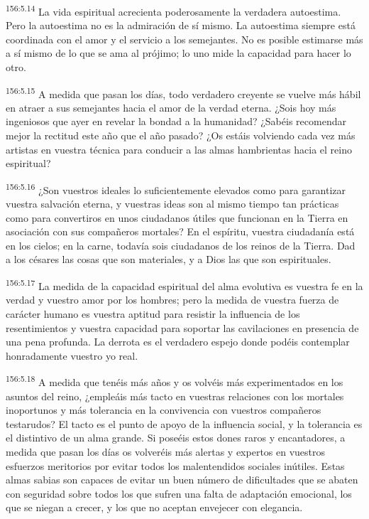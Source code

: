 \par 
\textsuperscript{156:5.14} La vida espiritual acrecienta poderosamente la verdadera autoestima. Pero la autoestima no es la admiración de sí mismo. La autoestima siempre está coordinada con el amor y el servicio a los semejantes. No es posible estimarse más a sí mismo de lo que se ama al prójimo; lo uno mide la capacidad para hacer lo otro.

\par 
\textsuperscript{156:5.15} A medida que pasan los días, todo verdadero creyente se vuelve más hábil en atraer a sus semejantes hacia el amor de la verdad eterna. ¿Sois hoy más ingeniosos que ayer en revelar la bondad a la humanidad? ¿Sabéis recomendar mejor la rectitud este año que el año pasado? ¿Os estáis volviendo cada vez más artistas en vuestra técnica para conducir a las almas hambrientas hacia el reino espiritual?

\par 
\textsuperscript{156:5.16} ¿Son vuestros ideales lo suficientemente elevados como para garantizar vuestra salvación eterna, y vuestras ideas son al mismo tiempo tan prácticas como para convertiros en unos ciudadanos útiles que funcionan en la Tierra en asociación con sus compañeros mortales? En el espíritu, vuestra ciudadanía está en los cielos; en la carne, todavía sois ciudadanos de los reinos de la Tierra. Dad a los césares las cosas que son materiales, y a Dios las que son espirituales.

\par 
\textsuperscript{156:5.17} La medida de la capacidad espiritual del alma evolutiva es vuestra fe en la verdad y vuestro amor por los hombres; pero la medida de vuestra fuerza de carácter humano es vuestra aptitud para resistir la influencia de los resentimientos y vuestra capacidad para soportar las cavilaciones en presencia de una pena profunda. La derrota es el verdadero espejo donde podéis contemplar honradamente vuestro yo real.

\par 
\textsuperscript{156:5.18} A medida que tenéis más años y os volvéis más experimentados en los asuntos del reino, ¿empleáis más tacto en vuestras relaciones con los mortales inoportunos y más tolerancia en la convivencia con vuestros compañeros testarudos? El tacto es el punto de apoyo de la influencia social, y la tolerancia es el distintivo de un alma grande. Si poseéis estos dones raros y encantadores, a medida que pasan los días os volveréis más alertas y expertos en vuestros esfuerzos meritorios por evitar todos los malentendidos sociales inútiles. Estas almas sabias son capaces de evitar un buen número de dificultades que se abaten con seguridad sobre todos los que sufren una falta de adaptación emocional, los que se niegan a crecer, y los que no aceptan envejecer con elegancia.

